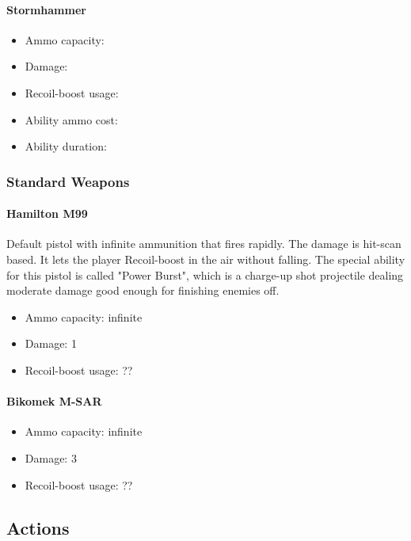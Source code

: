 \documentclass[12pt]{article}
\begin{document}
\paragraph{Stormhammer}

\begin{itemize}
	\item Ammo capacity: 
	\item Damage: 
	\item Recoil-boost usage: 
	\item Ability ammo cost: 
	\item Ability duration: 
\end{itemize}

\subsubsection{Standard Weapons}

\paragraph{Hamilton M99} 

Default pistol with infinite ammunition that fires rapidly. The damage is hit-scan based. It lets the player Recoil-boost in the air without falling. The special ability for this pistol is called "Power Burst", which is a charge-up shot projectile dealing moderate damage good enough for finishing enemies off. 

\begin{itemize}
	\item Ammo capacity: infinite
	\item Damage: 1
	\item Recoil-boost usage: ??
\end{itemize}

\paragraph{Bikomek M-SAR} 

\begin{itemize}
	\item Ammo capacity: infinite
	\item Damage: 3
	\item Recoil-boost usage: ??
\end{itemize}

\subsection{Actions}
\end{document}
